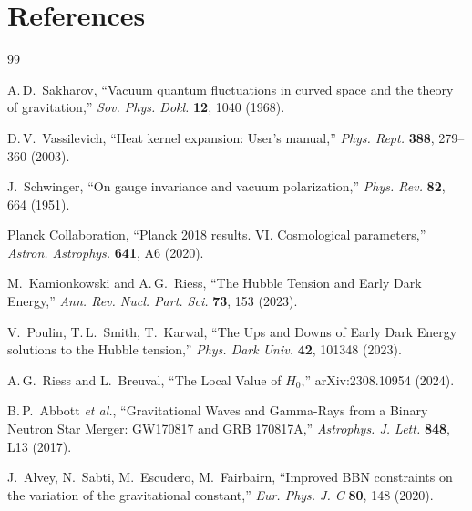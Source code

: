 \documentclass[11pt,a4paper]{article}
\begin{document}
\section*{References}
\begin{thebibliography}{99}

A.\,D.~Sakharov, ``Vacuum quantum fluctuations in curved space and the theory of gravitation,'' \emph{Sov. Phys. Dokl.} \textbf{12}, 1040 (1968).

D.\,V.~Vassilevich, ``Heat kernel expansion: User's manual,'' \emph{Phys. Rept.} \textbf{388}, 279--360 (2003).

J.~Schwinger, ``On gauge invariance and vacuum polarization,'' \emph{Phys. Rev.} \textbf{82}, 664 (1951).

Planck Collaboration, ``Planck 2018 results. VI. Cosmological parameters,'' \emph{Astron. Astrophys.} \textbf{641}, A6 (2020).

M.~Kamionkowski and A.\,G.~Riess, ``The Hubble Tension and Early Dark Energy,'' \emph{Ann. Rev. Nucl. Part. Sci.} \textbf{73}, 153 (2023).

V.~Poulin, T.\,L.~Smith, T.~Karwal, ``The Ups and Downs of Early Dark Energy solutions to the Hubble tension,'' \emph{Phys. Dark Univ.} \textbf{42}, 101348 (2023).

A.\,G.~Riess and L.~Breuval, ``The Local Value of $H_0$,'' arXiv:2308.10954 (2024).

B.\,P.~Abbott \emph{et al.}, ``Gravitational Waves and Gamma-Rays from a Binary Neutron Star Merger: GW170817 and GRB 170817A,'' \emph{Astrophys. J. Lett.} \textbf{848}, L13 (2017).

J.~Alvey, N.~Sabti, M.~Escudero, M.~Fairbairn, ``Improved BBN constraints on the variation of the gravitational constant,'' \emph{Eur. Phys. J. C} \textbf{80}, 148 (2020).

\end{thebibliography}
\end{document}
